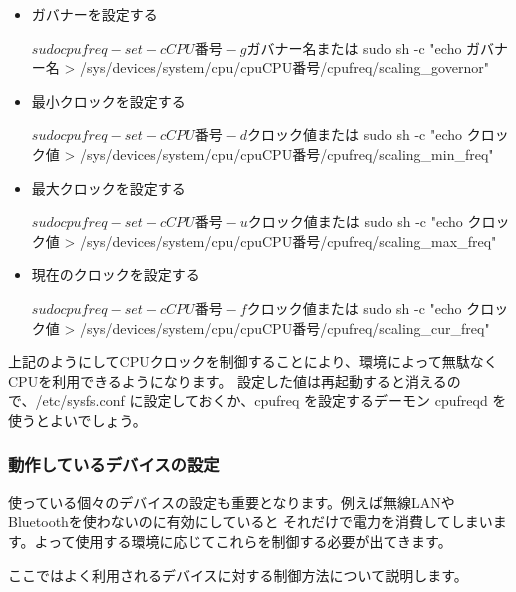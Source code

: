 \documentclass[mingoth,a4paper]{jsarticle}
\begin{document}
\begin{itemize}
\item ガバナーを設定する
  \begin{commandline}
   $ sudo cpufreq-set -c CPU番号 -g ガバナー名
   または
   $ sudo sh -c "echo ガバナー名 > /sys/devices/system/cpu/cpuCPU番号/cpufreq/scaling_governor"
  \end{commandline}

\item 最小クロックを設定する
  \begin{commandline}
   $ sudo cpufreq-set -c CPU番号 -d クロック値
   または
   $ sudo sh -c "echo クロック値 > /sys/devices/system/cpu/cpuCPU番号/cpufreq/scaling_min_freq"
  \end{commandline}

\item 最大クロックを設定する
  \begin{commandline}
   $ sudo cpufreq-set -c CPU番号 -u クロック値
   または
   $ sudo sh -c "echo クロック値 > /sys/devices/system/cpu/cpuCPU番号/cpufreq/scaling_max_freq"
  \end{commandline}

\item 現在のクロックを設定する
  \begin{commandline}
   $ sudo cpufreq-set -c CPU番号 -f クロック値
   または
   $ sudo sh -c "echo クロック値 > /sys/devices/system/cpu/cpuCPU番号/cpufreq/scaling_cur_freq"
  \end{commandline}

\end{itemize}

上記のようにしてCPUクロックを制御することにより、環境によって無駄なくCPUを利用できるようになります。
設定した値は再起動すると消えるので、/etc/sysfs.conf に設定しておくか、cpufreq を設定するデーモン cpufreqd
を使うとよいでしょう。

\subsubsection{動作しているデバイスの設定}

使っている個々のデバイスの設定も重要となります。例えば無線LANやBluetoothを使わないのに有効にしていると
それだけで電力を消費してしまいます。よって使用する環境に応じてこれらを制御する必要が出てきます。

ここではよく利用されるデバイスに対する制御方法について説明します。
\end{document}
